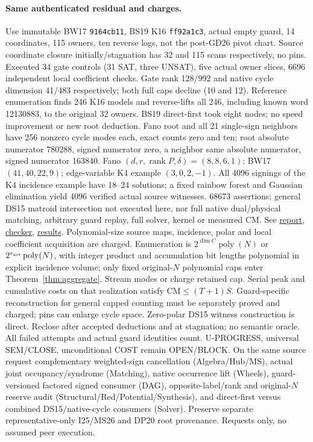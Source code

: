 \documentclass[11pt]{article}
\begin{document}
\paragraph{Same authenticated residual and charges.}
Use immutable BW17 \texttt{9164cb11}, BS19 K16 \texttt{ff92a1c3}, actual empty guard, 14 coordinates, 115 owners, ten reverse logs, not the post-GD26 pivot chart. Source coordinate closure initially/stagnation has 32 and 115 scans respectively, no pins. Executed 34 gate controls (31 SAT, three UNSAT), five actual owner slices, 6696 independent local coefficient checks. Gate rank 128/992 and native cycle dimension 41/483 respectively; both full caps decline (10 and 12). Reference enumeration finds 246 K16 models and reverse-lifts all 246, including known word 12130883, to the original 32 owners. BS19 direct-first took eight nodes; no speed improvement or new root deduction. Fano root and all 21 single-sign neighbors have 256 nonzero cycle modes each, exact counts zero and ten; root absolute numerator 780288, signed numerator zero, a neighbor same absolute numerator, signed numerator 163840. Fano $(d,r,\operatorname{rank}P,\delta)=(8,8,6,1)$; BW17 $(41,40,22,9)$; edge-variable K4 example $(3,0,2,-1)$. All 4096 signings of the K4 incidence example have 18--24 solutions; a fixed rainbow forest and Gaussian elimination yield 4096 verified actual source witnesses. 68673 assertions; general DS15 matroid intersection not executed here, nor full native dual/physical matching, arbitrary guard replay, full solver, kernel or measured CM. See \href{https://github.com/j15marti/pnp/commit/9cda5f9e8c8b1a5c5ed810abd07ffb47f6c22306}{report}, \href{https://github.com/j15marti/pnp/commit/c5928a63d22e3a9addb63f06ee2db40175cef0fc}{checker}, \href{https://github.com/j15marti/pnp/commit/6ec39062192abcd812fa9f73010c3a13d75d3b45}{results}.
Polynomial-size source maps, incidence, polar and local coefficient acquisition are charged. Enumeration is $2^{\dim C}\operatorname{poly}(N)$ or $2^{r_{\rm act}}\operatorname{poly}(N)$, with integer product and accumulation bit lengths polynomial in explicit incidence volume; only fixed original-$N$ polynomial caps enter Theorem~\ref{thm:aggregate}. Stream modes or charge retained cap. Serial peak and cumulative costs on that realization satisfy $\mathrm{CM}\le(T+1)S$. Guard-specific reconstruction for general capped counting must be separately proved and charged; pins can enlarge cycle space. Zero-polar DS15 witness construction is direct. Reclose after accepted deductions and at stagnation; no semantic oracle. All failed attempts and actual guard identities count. U-PROGRESS, universal SEM/CLOSE, unconditional COST remain OPEN/BLOCK. On the same source request complementary weighted-sign cancellation (Algebra/Hub/MS), actual joint occupancy/syndrome (Matching), native occurrence lift (Wheels), guard-versioned factored signed consumer (DAG), opposite-label/rank and original-$N$ reserve audit (Structural/Red/Potential/Synthesis), and direct-first versus combined DS15/native-cycle consumers (Solver). Preserve separate representative-only I25/MS26 and DP20 root provenance. Requests only, no assumed peer execution.
\end{document}
